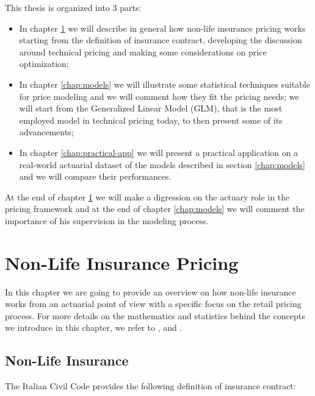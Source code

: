 \documentclass[a4paper, twoside, openright, 12pt]{report}
\theoremstyle{definition}
\theoremstyle{definition}
\theoremstyle{definition}
\theoremstyle{remark}
\begin{document}
This thesis is organized into 3 parts:

\begin{itemize}[itemsep=2pt]
\item In chapter \ref{chap:nlip} we will describe in general how non-life insurance pricing works starting from the definition of insurance contract, developing the discussion around technical pricing and making some considerations on price optimization;
\item In chapter \ref{chap:models} we will illustrate some statistical techniques suitable for price modeling and we will comment how they fit the pricing needs; we will start from the Generalized Linear Model (GLM), that is the most employed model in technical pricing today, to then present some of its advancements;
\item In chapter \ref{chap:practical-app} we will present a practical application on a real-world actuarial dataset of the models described in section \ref{chap:models} and we will compare their performances.
\end{itemize}

At the end of chapter \ref{chap:nlip} we will make a digression on the actuary role in the pricing framework and at the end of chapter \ref{chap:models} we will comment the importance of his supervision in the modeling process.

\hypertarget{chap:nlip}{%
\chapter{Non-Life Insurance Pricing}\label{chap:nlip}}

In this chapter we are going to provide an overview on how non-life insurance works from an actuarial point of view with a specific focus on the retail pricing process. For more details on the mathematics and statistics behind the concepts we introduce in this chapter, we refer to \autocite{wuthrich-non-life-insurance-math-stats}, \autocite{wuthrich-data-analytics} and \autocite{gigante2010tariffazione}.

\hypertarget{chap:non-life-ins}{%
\section{Non-Life Insurance}\label{chap:non-life-ins}}

The Italian Civil Code \autocite{italian-civil-code} provides the following definition of insurance contract:
\end{document}
